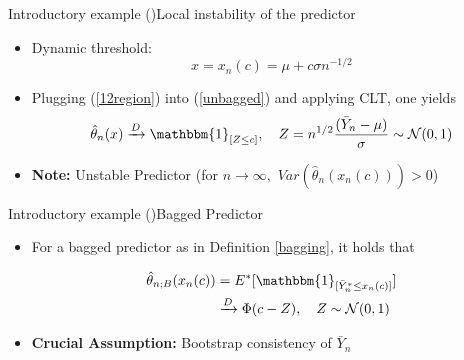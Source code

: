 \documentclass{beamer}
\begin{document}
\begin{frame}{Introductory example (\cite{Buhlmann2002})}{Local instability of the predictor}
\begin{itemize}
\item Dynamic threshold:
\begin{equation}\label{12region}
 x = x_{n}(c)= \mu + c\sigma n^{-1/2}
\end{equation}



\item Plugging (\ref{12region}) into (\ref{unbagged}) and applying CLT, one yields
$$\hat{\theta}_{n}(x) \xrightarrow{D} \mathbbm{1}_{[Z \leq c]}, \quad Z= n^{1/2} \frac{(\bar{Y}_{n} - \mu )}{\sigma} \sim \mathcal{N}(0,1)$$

\item \textbf{Note:} Unstable Predictor (for $n \rightarrow \infty,$ $Var(\hat{\theta}_{n}(x_{n}(c))) > 0$)
\end{itemize}
\end{frame}

\begin{frame}{Introductory example (\cite{Buhlmann2002})}{Bagged Predictor}
\begin{itemize}
\item For a bagged predictor as in Definition \ref{bagging}, it holds that

\begin{equation}
\begin{split}
\hat{\theta}_{n;B}(x_{n}(c)) & =E^{*}[\mathbbm{1}_{[\bar{Y}_{n}^{*} \leq x_{n}(c)]}]\\
& \xrightarrow{D} \Phi(c-Z),\quad Z \sim \mathcal{N}(0,1)
\end{split}
\end{equation}

\item \textbf{Crucial Assumption:} Bootstrap consistency of $\bar{Y}_{n}$
\end{itemize}
\end{frame}
\end{document}
